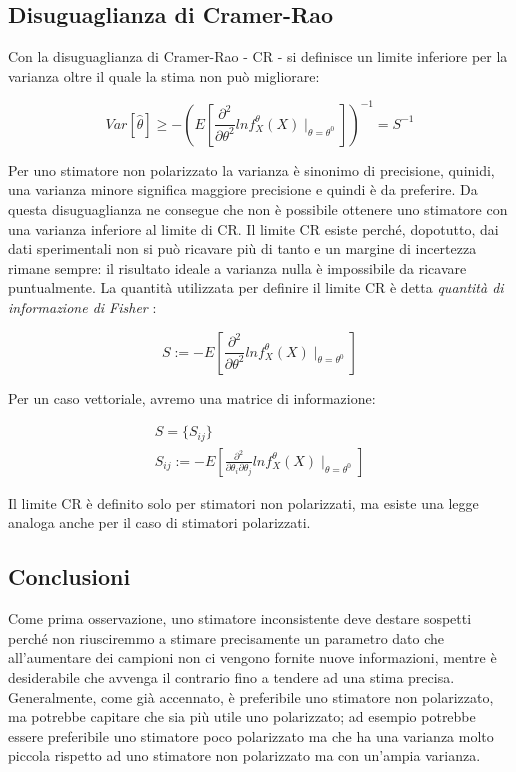 \subsection{Disuguaglianza di Cramer-Rao}
Con la disuguaglianza di Cramer-Rao  - CR - si definisce un limite inferiore per la varianza oltre il quale la stima non può migliorare:

    \[ Var[\hat{\theta}]\geq - \left( E\left[\frac{\partial^2}{\partial\theta^2} ln f_X^\theta(X)\mid_{\theta=\theta^0}\right] \right)^{-1} = S^{-1} \]

Per uno stimatore non polarizzato la varianza è sinonimo di precisione, quinidi, una varianza minore significa maggiore precisione e quindi è da preferire. Da questa disuguaglianza ne consegue che non è possibile ottenere uno stimatore con una varianza inferiore al limite di CR. Il limite CR esiste perché, dopotutto, dai dati sperimentali non si può ricavare più di tanto e un margine di incertezza rimane sempre: il risultato ideale a varianza nulla è impossibile da ricavare puntualmente.\newline
La quantità utilizzata per definire il limite CR è detta \textit{quantità di informazione di Fisher} :

    \[ S:= -  E\left[\frac{\partial^2}{\partial \theta^2} ln f_X^\theta(X)\mid_{\theta=\theta^0}\right] \]

Per un caso vettoriale, avremo una matrice di informazione:

\begin{gather*}
  S= \{ S_{ij}\}  \\
  S_{ij}:= -  E\left[\frac{\partial^2}{\partial \theta_i\partial \theta_j} ln f_X^\theta(X)\mid_{\theta=\theta^0}\right]
\end{gather*}

Il limite CR è definito solo per stimatori non polarizzati, ma esiste una legge analoga anche per il caso di stimatori polarizzati.
\subsection{Conclusioni}
Come prima osservazione, uno stimatore inconsistente deve destare sospetti perché non riusciremmo a stimare precisamente un parametro dato che all'aumentare dei campioni non ci vengono fornite nuove informazioni, mentre è desiderabile che avvenga il contrario fino a tendere ad una stima precisa.\newline
Generalmente, come già accennato, è preferibile uno stimatore non polarizzato, ma potrebbe capitare che sia più utile uno polarizzato; ad esempio potrebbe essere preferibile uno stimatore poco polarizzato ma che ha una varianza molto piccola rispetto ad uno stimatore non polarizzato ma con un'ampia varianza.

